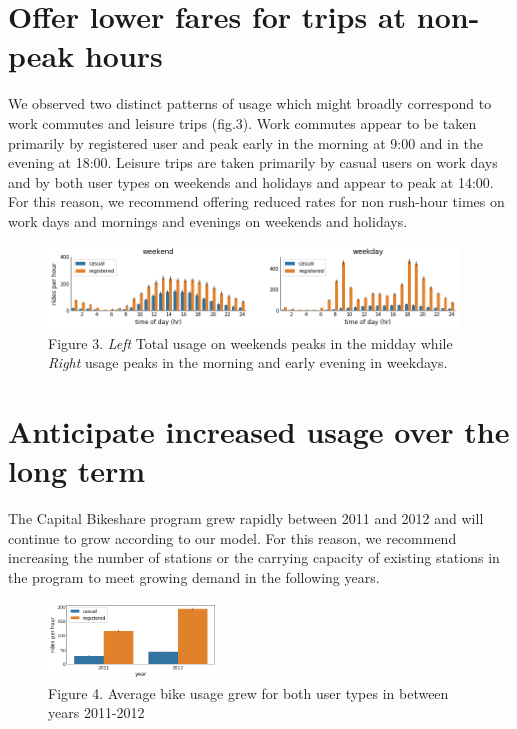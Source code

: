 \documentclass[11pt]{article}
\begin{document}
\section{Offer lower fares for trips at non-peak hours}

We observed two distinct patterns of usage which might broadly correspond to work commutes and leisure trips (fig.3). Work commutes appear to be taken primarily by registered user and peak early in the morning at 9:00 and in the evening at 18:00. Leisure trips are taken primarily by casual users on work days and by both user types on weekends and holidays and appear to peak at 14:00. For this reason, we recommend offering reduced rates for non rush-hour times on work days and mornings and evenings on weekends and holidays.

\begin{figure}[h!]
	\centering
	\includegraphics[width=0.97\textwidth]{figs/usertype_effect.png}
	\caption*{\footnotesize Figure 3. \textit{Left} Total usage on weekends peaks in the midday while \textit{Right} usage peaks in the morning and early evening in weekdays.}
\end{figure}


\section{Anticipate increased usage over the long term}

The Capital Bikeshare program grew rapidly between 2011 and 2012 and will continue to grow according to our model. For this reason, we recommend increasing the number of stations or the carrying capacity of existing stations in the program to meet growing demand in the following years.
 
\begin{figure}[h!]
	\centering
	\includegraphics[width=0.4\textwidth]{figs/year_effect.png}
	\caption*{\footnotesize Figure 4. Average bike usage grew for both user types in between years 2011-2012}
\end{figure}
\end{document}
